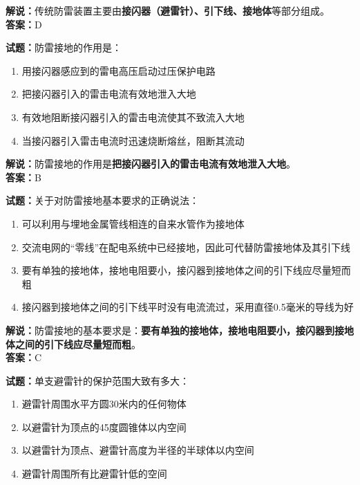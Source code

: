 \documentclass{ctexbook}
\begin{document}
\noindent\textbf{解说：}传统防雷装置主要由\textbf{接闪器（避雷针）、引下线、接地体}等部分组成。\\\noindent\textbf{答案：}D

\bigskip


\noindent\textbf{试题：}防雷接地的作用是：

\begin{enumerate}[leftmargin=3em]
	\item 用接闪器感应到的雷电高压启动过压保护电路
	\item 把接闪器引入的雷击电流有效地泄入大地
	\item 有效地阻断接闪器引入的雷击电流使其不致流入大地
	\item 当接闪器引入雷击电流时迅速烧断熔丝，阻断其流动
\end{enumerate}

\noindent\textbf{解说：}防雷接地的作用是\textbf{把接闪器引入的雷击电流有效地泄入大地}。\\\noindent\textbf{答案：}B


\bigskip


\noindent\textbf{试题：}关于对防雷接地基本要求的正确说法：

\begin{enumerate}[leftmargin=3em]
	\item 可以利用与埋地金属管线相连的自来水管作为接地体
	\item 交流电网的“零线”在配电系统中已经接地，因此可代替防雷接地体及其引下线
	\item 要有单独的接地体，接地电阻要小，接闪器到接地体之间的引下线应尽量短而粗
	\item 接闪器到接地体之间的引下线平时没有电流流过，采用直径0.5毫米的导线为好
\end{enumerate}

\noindent\textbf{解说：}防雷接地的基本要求是：\textbf{要有单独的接地体，接地电阻要小，接闪器到接地体之间的引下线应尽量短而粗}。\\\noindent\textbf{答案：}C%


\bigskip


\noindent\textbf{试题：}单支避雷针的保护范围大致有多大：

\begin{enumerate}[leftmargin=3em]
	\item 避雷针周围水平方圆30米内的任何物体
	\item 以避雷针为顶点的45度圆锥体以内空间
	\item 以避雷针为顶点、避雷针高度为半径的半球体以内空间
	\item 避雷针周围所有比避雷针低的空间
\end{enumerate}
\end{document}
